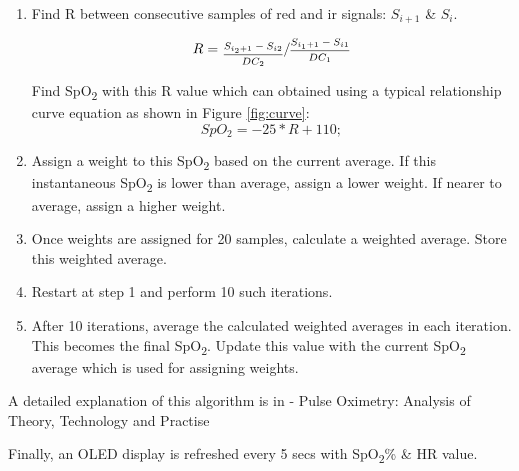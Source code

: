 		\begin{enumerate}
			\item Find R between consecutive samples of red and ir signals: $S_{i+1}$ \& $S_{i}$. 
			
			\[
			R = \sfrac{\frac{S_{i_2+1} - S_{i2}}{DC_2}}{\frac{S_{i_1+1} - S_{i1}}{DC_1}}
			\]	
			
			Find SpO\textsubscript{2} with this R value which can obtained using a typical relationship curve equation as shown in Figure \ref{fig:curve}:
			\[		
				SpO_2 = -25*R + 110;
			\]
			\item Assign a weight to this SpO\textsubscript{2} based on the current average. If this instantaneous SpO\textsubscript{2} is lower than average, assign a lower weight. If nearer to average, assign a higher weight.
			
			\item Once weights are assigned for 20 samples, calculate a weighted average. Store this weighted average.
			
			\item Restart at step 1 and perform 10 such iterations.
			\item After 10 iterations, average the calculated weighted averages in each iteration. This becomes the final SpO\textsubscript{2}. Update this value with the current SpO\textsubscript{2} average which is used for assigning weights.
		\end{enumerate}
			
		A detailed explanation of this algorithm is in - Pulse Oximetry: Analysis of Theory, Technology and Practise\cite{wuk}
		
		Finally, an OLED display is refreshed every 5 secs with SpO\textsubscript{2}\% \& HR value.
		

